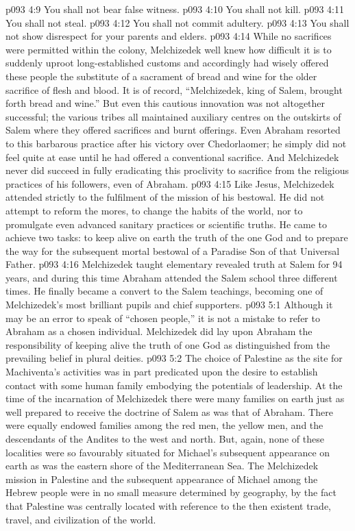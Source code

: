\vs p093 4:9 \bibnobreakspace You shall not bear false witness.
\vs p093 4:10 \bibnobreakspace You shall not kill.
\vs p093 4:11 \bibnobreakspace You shall not steal.
\vs p093 4:12 \bibnobreakspace You shall not commit adultery.
\vs p093 4:13 \bibnobreakspace You shall not show disrespect for your parents and elders.
\vs p093 4:14 \pc While no sacrifices were permitted within the colony, Melchizedek well knew how difficult it is to suddenly uproot long\hyp{}established customs and accordingly had wisely offered these people the substitute of a sacrament of bread and wine for the older sacrifice of flesh and blood. It is of record, “Melchizedek, king of Salem, brought forth bread and wine.” But even this cautious innovation was not altogether successful; the various tribes all maintained auxiliary centres on the outskirts of Salem where they offered sacrifices and burnt offerings. Even Abraham resorted to this barbarous practice after his victory over Chedorlaomer; he simply did not feel quite at ease until he had offered a conventional sacrifice. And Melchizedek never did succeed in fully eradicating this proclivity to sacrifice from the religious practices of his followers, even of Abraham.
\vs p093 4:15 Like Jesus, Melchizedek attended strictly to the fulfilment of the mission of his bestowal. He did not attempt to reform the mores, to change the habits of the world, nor to promulgate even advanced sanitary practices or scientific truths. He came to achieve two tasks: to keep alive on earth the truth of the one God and to prepare the way for the subsequent mortal bestowal of a Paradise Son of that Universal Father.
\vs p093 4:16 \pc Melchizedek taught elementary revealed truth at Salem for 94 years, and during this time Abraham attended the Salem school three different times. He finally became a convert to the Salem teachings, becoming one of Melchizedek’s most brilliant pupils and chief supporters.
\vs p093 5:1 Although it may be an error to speak of “chosen people,” it is not a mistake to refer to Abraham as a chosen individual. Melchizedek did lay upon Abraham the responsibility of keeping alive the truth of one God as distinguished from the prevailing belief in plural deities.
\vs p093 5:2 The choice of Palestine as the site for Machiventa’s activities was in part predicated upon the desire to establish contact with some human family embodying the potentials of leadership. At the time of the incarnation of Melchizedek there were many families on earth just as well prepared to receive the doctrine of Salem as was that of Abraham. There were equally endowed families among the red men, the yellow men, and the descendants of the Andites to the west and north. But, again, none of these localities were so favourably situated for Michael’s subsequent appearance on earth as was the eastern shore of the Mediterranean Sea. The Melchizedek mission in Palestine and the subsequent appearance of Michael among the Hebrew people were in no small measure determined by geography, by the fact that Palestine was centrally located with reference to the then existent trade, travel, and civilization of the world.

